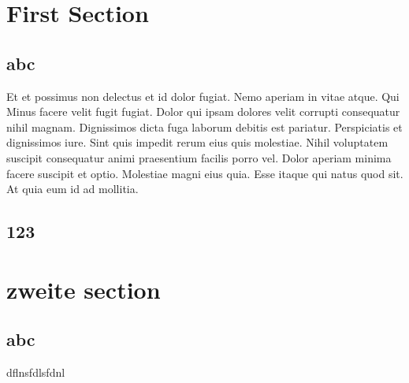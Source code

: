 \documentclass{article}
\begin{document}
	\section{First Section}
	   \subsection{abc}
		Et et possimus non delectus et id dolor fugiat. Nemo aperiam in
		vitae atque.  Qui  Minus facere velit fugit fugiat.
		Dolor qui ipsam dolores velit corrupti consequatur nihil
		magnam.   Dignissimos
		dicta fuga laborum debitis est pariatur.  Perspiciatis et
		dignissimos iure. Sint quis impedit rerum eius quis molestiae.
		Nihil voluptatem suscipit consequatur animi praesentium facilis
		porro vel. Dolor aperiam minima facere suscipit et optio.
		Molestiae magni eius quia. Esse itaque qui natus quod sit. At
		quia eum id ad mollitia.
		\subsection{123}
	\section{zweite section}
		\subsection{abc}
		dflnsfdlsfdnl
\end{document}
